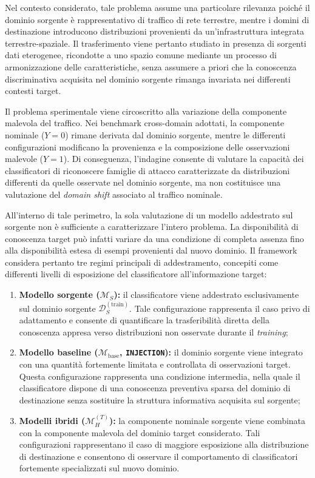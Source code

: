 Nel contesto considerato, tale problema assume una particolare rilevanza poiché il dominio sorgente è rappresentativo di traffico di rete terrestre, mentre i domini di destinazione introducono distribuzioni provenienti da un'infrastruttura integrata terrestre-spaziale. 
Il trasferimento viene pertanto studiato in presenza di sorgenti dati eterogenee, ricondotte a uno spazio comune mediante un processo di armonizzazione delle caratteristiche, senza assumere a priori che la conoscenza discriminativa acquisita nel dominio sorgente rimanga invariata nei differenti contesti target.

Il problema sperimentale viene circoscritto alla variazione della componente malevola del traffico. 
Nei benchmark cross-domain adottati, la componente nominale ($Y=0$) rimane derivata dal dominio sorgente, mentre le differenti configurazioni modificano la provenienza e la composizione delle osservazioni malevole ($Y=1$). 
Di conseguenza, l'indagine consente di valutare la capacità dei classificatori di riconoscere famiglie di attacco caratterizzate da distribuzioni differenti da quelle osservate nel dominio sorgente, ma non costituisce una valutazione del \textit{domain shift} associato al traffico nominale.

All'interno di tale perimetro, la sola valutazione di un modello addestrato sul sorgente non è sufficiente a caratterizzare l'intero problema. 
La disponibilità di conoscenza target può infatti variare da una condizione di completa assenza fino alla disponibilità estesa di esempi provenienti dal nuovo dominio. 
Il framework considera pertanto tre regimi principali di addestramento, concepiti come differenti livelli di esposizione del classificatore all'informazione target:
\begin{enumerate}
    \item \textbf{Modello sorgente ($\mathcal{M}_{S}$):} il classificatore viene addestrato esclusivamente sul dominio sorgente $\mathcal{D}_{S}^{(\text{train})}$. 
    Tale configurazione rappresenta il caso privo di adattamento e consente di quantificare la trasferibilità diretta della conoscenza appresa verso distribuzioni non osservate durante il \textit{training};

    \item \textbf{Modello baseline ($\mathcal{M}_{\text{base}}$, \texttt{INJECTION}):} il dominio sorgente viene integrato con una quantità fortemente limitata e controllata di osservazioni target. 
    Questa configurazione rappresenta una condizione intermedia, nella quale il classificatore dispone di una conoscenza preventiva sparsa del dominio di destinazione senza sostituire la struttura informativa acquisita sul sorgente;

    \item \textbf{Modelli ibridi ($\mathcal{M}_{H}^{(T)}$):} la componente nominale sorgente viene combinata con la componente malevola del dominio target considerato. 
    Tali configurazioni rappresentano il caso di maggiore esposizione alla distribuzione di destinazione e consentono di osservare il comportamento di classificatori fortemente specializzati sul nuovo dominio.
\end{enumerate}

